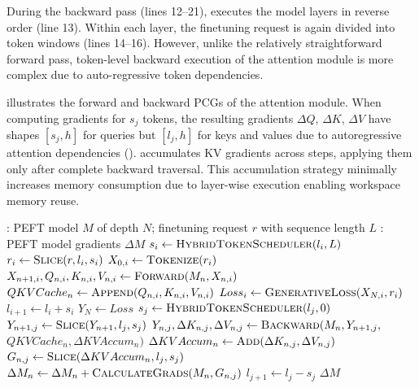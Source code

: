 During the backward pass (lines 12--21), \FlexLLM executes the model layers in reverse order (line 13).
Within each layer, the finetuning request is again divided into token windows (lines 14--16).
However, unlike the relatively straightforward forward pass, token-level backward execution of the attention module is more complex due to auto-regressive token dependencies.

 illustrates the forward and backward PCGs of the attention module. When computing gradients for $s_j$ tokens, the resulting gradients $\Delta Q$, $\Delta K$, $\Delta V$ have shapes $[s_j, h]$ for queries but $[l_j, h]$ for keys and values due to autoregressive attention dependencies (). \FlexLLM accumulates KV gradients across steps, applying them only after complete backward traversal. This accumulation strategy minimally increases memory consumption due to layer-wise execution enabling workspace memory reuse.

\begin{algorithm}[htbp]
\caption{Token-level finetuning mechanism.}
\label{flexllm:alg:token-level-finetuning}
\begin{algorithmic}[1]
: PEFT model $M$ of depth $N$; finetuning request $r$ with sequence length $L$
: PEFT model gradients $\Delta M$
 
\State $s_i\gets \Call{HybridTokenScheduler}{l_i, L}$
\State $r_i \gets \Call{Slice}{r, l_i, s_i}$
\State $X_{0,i} \gets \Call{Tokenize}{r_i}$
\State $X_{n+1, i}, Q_{n, i}, K_{n, i}, V_{n, i} \gets \Call{Forward}{M_n, X_{n, i}}$
\State $QKVCache_n\gets \Call{Append}{Q_{n, i}, K_{n, i}, V_{n, i}}$
\EndFor
\State $Loss_{i} \gets \Call{GenerativeLoss}{X_{N, i}, r_i}$
\State $l_{i+1}\gets l_i + s_i$
\EndFor
\State $Y_{N}\gets Loss$
 
\State $s_j\gets \Call{HybridTokenScheduler}{l_j, 0}$
\State $Y_{n+1, j} \gets \Call{Slice}{Y_{n+1}, l_j, s_j}$
\State $Y_{n, j}, \Delta K_{n, j}, \Delta V_{n, j} \gets \textsc{Backward}(M_n, Y_{n+1, j},$
\Statex \hfill $QKVCache_n, \Delta KVAccum_n)$
\State $\Delta KVAccum_n\gets\Call{Add}{\Delta K_{n, j}, \Delta V_{n, j}}$
\State $G_{n, j}\gets \Call{Slice}{\Delta KVAccum_n, l_j, s_j}$
\State $\Delta M_{n} \gets \Delta M_{n}+\Call{CalculateGrads}{M_n, G_{n, j}}$
\EndFor
\State $l_{j+1}\gets l_j-s_j$
\EndFor
{} $\Delta M$
\end{algorithmic}
\end{algorithm}

